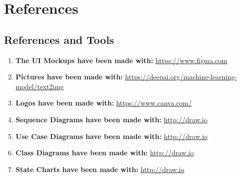 \documentclass{article}
\begin{document}
\section{References}
\subsection{References and Tools}
\begin{enumerate}
    \item \textbf{The UI Mockups have been made with:} \url{https://www.figma.com}
    \item \textbf{Pictures have been made with:} \url{https://deepai.org/machine-learning-model/text2img}
    \item \textbf{Logos have been made with:} \url{https://www.canva.com/}
    \item \textbf{Sequence Diagrams have been made with:} \url{http://draw.io}
    \item \textbf{Use Case Diagrams have been made with:} \url{http://draw.io}
    \item \textbf{Class Diagrams have been made with:} \url{http://draw.io}
    \item \textbf{State Charts have been made with:} \url{http://draw.io}
\end{enumerate}

\maketitle
\end{document}
